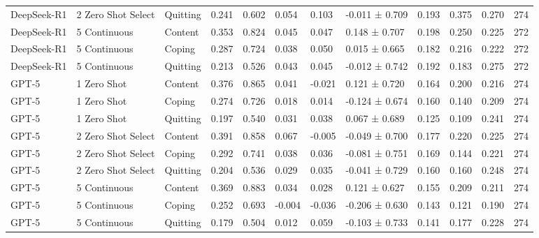 \begin{tabular}{lllllllllllr}
DeepSeek-R1 & 2 Zero Shot Select & Quitting & 0.241 & 0.602 & 0.054 & 0.103 & -0.011 ± 0.709 & 0.193 & 0.375 & 0.270 & 274 \\
DeepSeek-R1 & 5 Continuous & Content & 0.353 & 0.824 & 0.045 & 0.047 & 0.148 ± 0.707 & 0.198 & 0.250 & 0.225 & 272 \\
DeepSeek-R1 & 5 Continuous & Coping & 0.287 & 0.724 & 0.038 & 0.050 & 0.015 ± 0.665 & 0.182 & 0.216 & 0.222 & 272 \\
DeepSeek-R1 & 5 Continuous & Quitting & 0.213 & 0.526 & 0.043 & 0.045 & -0.012 ± 0.742 & 0.192 & 0.183 & 0.275 & 272 \\
GPT-5 & 1 Zero Shot & Content & 0.376 & 0.865 & 0.041 & -0.021 & 0.121 ± 0.720 & 0.164 & 0.200 & 0.216 & 274 \\
GPT-5 & 1 Zero Shot & Coping & 0.274 & 0.726 & 0.018 & 0.014 & -0.124 ± 0.674 & 0.160 & 0.140 & 0.209 & 274 \\
GPT-5 & 1 Zero Shot & Quitting & 0.197 & 0.540 & 0.031 & 0.038 & 0.067 ± 0.689 & 0.125 & 0.109 & 0.241 & 274 \\
GPT-5 & 2 Zero Shot Select & Content & 0.391 & 0.858 & 0.067 & -0.005 & -0.049 ± 0.700 & 0.177 & 0.220 & 0.225 & 274 \\
GPT-5 & 2 Zero Shot Select & Coping & 0.292 & 0.741 & 0.038 & 0.036 & -0.081 ± 0.751 & 0.169 & 0.144 & 0.221 & 274 \\
GPT-5 & 2 Zero Shot Select & Quitting & 0.204 & 0.536 & 0.029 & 0.035 & -0.041 ± 0.729 & 0.160 & 0.160 & 0.248 & 274 \\
GPT-5 & 5 Continuous & Content & 0.369 & 0.883 & 0.034 & 0.028 & 0.121 ± 0.627 & 0.155 & 0.209 & 0.211 & 274 \\
GPT-5 & 5 Continuous & Coping & 0.252 & 0.693 & -0.004 & -0.036 & -0.206 ± 0.630 & 0.143 & 0.121 & 0.190 & 274 \\
GPT-5 & 5 Continuous & Quitting & 0.179 & 0.504 & 0.012 & 0.059 & -0.103 ± 0.733 & 0.141 & 0.177 & 0.228 & 274 \\
\bottomrule
\end{tabular}
